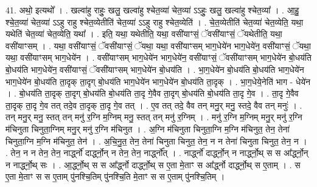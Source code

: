 \documentclass[17pt]{extarticle}
\begin{document}
41. अथो॒ इत्यथो᳚ । . खल्वा॑हु राहुः॒ खलु॒ खल्वा॑हु श्चेत॒व्या॑ चेत॒व्या॑ ऽऽहुः॒ खलु॒ खल्वा॑हु श्चेत॒व्या᳚ । . आ॒हु॒ श्चे॒त॒व्या॑ चेत॒व्या॑ ऽऽहु राहु श्चेत॒व्येतीति॑ चेत॒व्या॑ ऽऽहु राहु श्चेत॒व्येति॑ । . चे॒त॒व्येतीति॑ चेत॒व्या॑ चेत॒व्येति॒ यथा॒ यथेति॑ चेत॒व्या॑ चेत॒व्येति॒ यथा᳚ । . इति॒ यथा॒ यथेतीति॒ यथा॒ वसी॑याꣳसं॒ ॅवसी॑याꣳसं॒ ॅयथेतीति॒ यथा॒ वसी॑याꣳसम् । . यथा॒ वसी॑याꣳसं॒ ॅवसी॑याꣳसं॒ ॅयथा॒ यथा॒ वसी॑याꣳसम् भाग॒धेये॑न भाग॒धेये॑न॒ वसी॑याꣳसं॒ ॅयथा॒ यथा॒ वसी॑याꣳसम् भाग॒धेये॑न । . वसी॑याꣳसम् भाग॒धेये॑न भाग॒धेये॑न॒ वसी॑याꣳसं॒ ॅवसी॑याꣳसम् भाग॒धेये॑न बो॒धय॑ति बो॒धय॑ति भाग॒धेये॑न॒ वसी॑याꣳसं॒ ॅवसी॑याꣳसम् भाग॒धेये॑न बो॒धय॑ति । . भा॒ग॒धेये॑न बो॒धय॑ति बो॒धय॑ति भाग॒धेये॑न भाग॒धेये॑न बो॒धय॑ति ता॒दृक् ता॒दृग् बो॒धय॑ति भाग॒धेये॑न भाग॒धेये॑न बो॒धय॑ति ता॒दृक् । . भा॒ग॒धेये॒नेति॑ भाग - धेये॑न । . बो॒धय॑ति ता॒दृक् ता॒दृग् बो॒धय॑ति बो॒धय॑ति ता॒दृ गे॒वैव ता॒दृग् बो॒धय॑ति बो॒धय॑ति ता॒दृ गे॒व । . ता॒दृ गे॒वैव ता॒दृक् ता॒दृ गे॒व तत् तदे॒व ता॒दृक् ता॒दृ गे॒व तत् । . ए॒व तत् तदे॒ वैव तन् मनु॒र् मनु॒ स्तदे॒ वैव तन् मनुः॑ । . तन् मनु॒र् मनु॒ स्तत् तन् मनु॑ र॒ग्नि म॒ग्निम् मनु॒ स्तत् तन् मनु॑ र॒ग्निम् । . मनु॑ र॒ग्नि म॒ग्निम् मनु॒र् मनु॑ र॒ग्नि म॑चिनुता चिनुता॒ग्निम् मनु॒र् मनु॑ र॒ग्नि म॑चिनुत । . अ॒ग्नि म॑चिनुता चिनुता॒ग्नि म॒ग्नि म॑चिनुत॒ तेन॒ तेना॑ चिनुता॒ग्नि म॒ग्नि म॑चिनुत॒ तेन॑ । . अ॒चि॒नु॒त॒ तेन॒ तेना॑ चिनुता चिनुत॒ तेन॒ न न तेना॑ चिनुता चिनुत॒ तेन॒ न । . तेन॒ न न तेन॒ तेन॒ नार्द्ध्नो॑ दार्द्ध्नो॒न् न तेन॒ तेन॒ नार्द्ध्नो᳚त् । . नार्द्ध्नो॑ दार्द्ध्नो॒न् न नार्द्ध्नो॒थ् स स आ᳚र्द्ध्नो॒न् न नार्द्ध्नो॒थ् सः । . आ॒र्द्ध्नो॒थ् स स आ᳚र्द्ध्नो दार्द्ध्नो॒थ् स ए॒ता मे॒ताꣳ स आ᳚र्द्ध्नो दार्द्ध्नो॒थ् स ए॒ताम् । . स ए॒ता मे॒ताꣳ स स ए॒ताम् पु॑नश्चि॒तिम् पु॑नश्चि॒ति मे॒ताꣳ स स ए॒ताम् पु॑नश्चि॒तिम् । \newline
\end{document}
